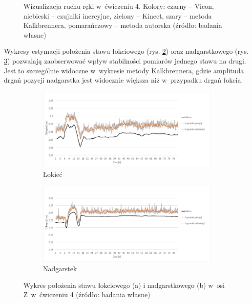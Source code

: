 \begin{figure}[!htb]
		\caption[Wizualizacja ruchu ręki w~ćwiczeniu 4]{Wizualizacja ruchu ręki w~ćwiczeniu 4.  Kolory: czarny -- Vicon, niebieski -- czujniki inercyjne, zielony -- Kinect, szary -- metoda Kalkbrennera, pomarańczowy -- metoda autorska (źródło: badania własne)}	
		\label{fig:experiments:four}
	\end{figure}
																						
Wykresy estymacji położenia stawu łokciowego (rys. \ref{fig:experiments:four:elbowZ}) oraz nadgarstkowego (rys. \ref{fig:experiments:four:wristZ}) pozwalają zaobserwować wpływ stabilności pomiarów jednego stawu na drugi. Jest to szczególnie widoczne w~wykresie metody Kalkbrennera, gdzie amplituda drgań pozycji nadgarstka jest widocznie większa niż w~przypadku drgań łokcia. 
					
	\begin{figure}[!htb]
		\centering
		\begin{subfigure}[b]{0.7\textwidth}
			\centering
			\includegraphics[width=\textwidth]{images/400/3.png}		
			\caption{Łokieć}
			\label{fig:experiments:four:elbowZ}
		\end{subfigure}
	\hfill
		\begin{subfigure}[b]{0.7\textwidth}
			\centering
			\includegraphics[width=\textwidth]{images/400/6.png}		
			\caption{Nadgarstek}
			\label{fig:experiments:four:wristZ}
		\end{subfigure}
		\caption[Wykres położenia stawu łokciowego i nadgarstkowego w~osi Z~w~ćwiczeniu 4]{Wykres położenia stawu łokciowego (a) i nadgarstkowego (b) w~osi Z~w~ćwiczeniu 4 (źródło: badania własne)}	
		\label{fig:experiments:four:Zaxis}
	\end{figure}
		

